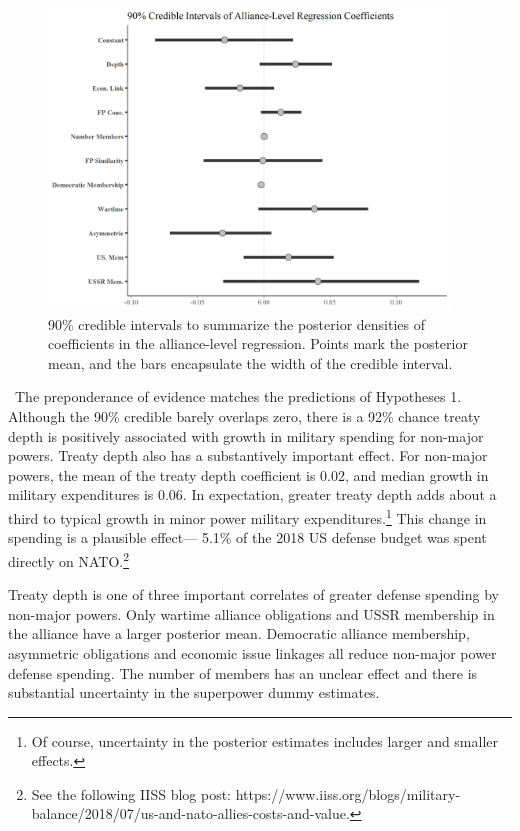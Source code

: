 \documentclass[12pt]{article}
\begin{document}
\begin{figure}[htbp]
	\centering
		\includegraphics[width=0.95\textwidth]{../figures/alliance-reg-nonmaj.png}
	\caption{90\% credible intervals to summarize the posterior densities of coefficients in the alliance-level regression. Points mark the posterior mean, and the bars encapsulate the width of the credible interval.}
	\label{fig:alliance-reg-nonmaj}
\end{figure}


\
The preponderance of evidence matches the predictions of Hypotheses 1. 
Although the 90\% credible barely overlaps zero, there is a 92\% chance treaty depth is positively associated with growth in military spending for non-major powers.
Treaty depth also has a substantively important effect. 
For non-major powers, the mean of the treaty depth coefficient is 0.02, and median growth in military expenditures is 0.06. 
In expectation, greater treaty depth adds about a third to typical growth in minor power military expenditures.\footnote{Of course, uncertainty in the posterior estimates includes larger and smaller effects.}
This change in spending is a plausible effect--- 5.1\% of the 2018 US defense budget was spent directly on NATO.\footnote{See the following IISS blog post: https://www.iiss.org/blogs/military-balance/2018/07/us-and-nato-allies-costs-and-value.} 


Treaty depth is one of three important correlates of greater defense spending by non-major powers. 
Only wartime alliance obligations and USSR membership in the alliance have a larger posterior mean.
Democratic alliance membership, asymmetric obligations and economic issue linkages all reduce non-major power defense spending.  
The number of members has an unclear effect and there is substantial uncertainty in the superpower dummy estimates. 
\end{document}
